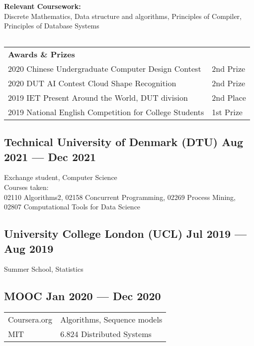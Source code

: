 \documentclass[a4,12pt]{article}
\begin{document}
\textbf{Relevant Coursework:}\\
Discrete Mathematics, Data structure and algorithms, Principles of Compiler, Principles of Database Systems
\begin{tabular}{p{10em} p{13em} p{10em} p{13em}}

\end{tabular}

\begin{tabular}{p{25em} p{21em}}
\textbf{Awards \& Prizes} & \\
2020 Chinese Undergraduate Computer Design Contest & 2nd Prize \\
2020 DUT AI Contest Cloud Shape Recognition & 2nd Prize \\
2019 IET Present Around the World, DUT division & 2nd Place \\
2019 National English Competition for College Students & 1st Prize \\
\end{tabular}



\vspace{-0.1cm}
\subsection*{Technical University of Denmark (DTU) \hfill \textbf{Aug 2021 --- Dec 2021}}
Exchange student, Computer Science \\ 
Courses taken: \\ 02110 Algorithms2, 02158 Concurrent Programming, 02269 Process Mining, 02807 Computational Tools for Data Science

\vspace{-0.1cm}
\subsection*{University College London (UCL) \hfill \textbf{Jul 2019 --- Aug 2019}}
Summer School, Statistics

\vspace{-0.1cm}
\subsection*{MOOC \hfill \textbf{Jan 2020 --- Dec 2020}}
\begin{tabular}{p{10em} p{21em}}
Coursera.org     & Algorithms, Sequence models \\
MIT     & 6.824 Distributed Systems
\end{tabular}
\vspace{0cm}
\end{document}
